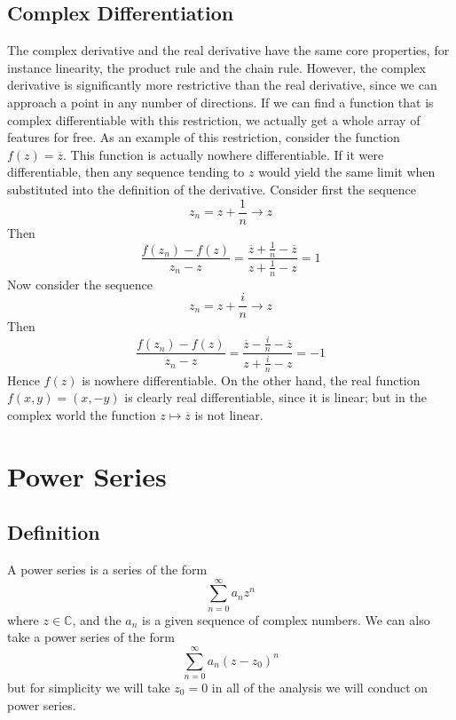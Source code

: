 \documentclass{article}
\begin{document}
\subsection{Complex Differentiation}
The complex derivative and the real derivative have the same core properties, for instance linearity, the product rule and the chain rule. However, the complex derivative is significantly more restrictive than the real derivative, since we can approach a point in any number of directions. If we can find a function that is complex differentiable with this restriction, we actually get a whole array of features for free. As an example of this restriction, consider the function $f(z) = \overline{z}$. This function is actually nowhere differentiable. If it were differentiable, then any sequence tending to $z$ would yield the same limit when substituted into the definition of the derivative. Consider first the sequence
\[ z_n = z + \frac{1}{n} \to z \]
Then
\[ \frac{f(z_n) - f(z)}{z_n - z} = \frac{\overline{z} + \frac{1}{n} - \overline{z}}{z + \frac{1}{n} - z} = 1 \]
Now consider the sequence
\[ z_n = z + \frac{i}{n} \to z \]
Then
\[ \frac{f(z_n) - f(z)}{z_n - z} = \frac{\overline{z} - \frac{i}{n} - \overline{z}}{z + \frac{i}{n} - z} = -1 \]
Hence $f(z)$ is nowhere differentiable. On the other hand, the real function $f(x, y) = (x, -y)$ is clearly real differentiable, since it is linear; but in the complex world the function $z \mapsto \overline{z}$ is not linear.

\section{Power Series}
\subsection{Definition}
A power series is a series of the form
\[ \sum_{n=0}^\infty a_n z^n \]
where $z \in \mathbb C$, and the $a_n$ is a given sequence of complex numbers. We can also take a power series of the form
\[ \sum_{n=0}^\infty a_n (z-z_0)^n \]
but for simplicity we will take $z_0 = 0$ in all of the analysis we will conduct on power series.
\end{document}
